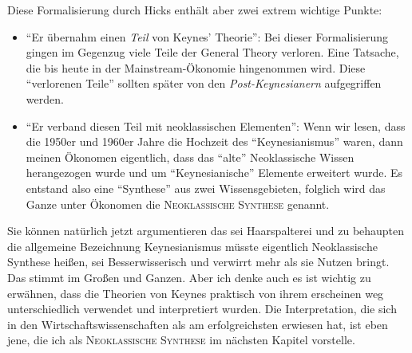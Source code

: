 Diese Formalisierung durch Hicks enthält aber zwei extrem wichtige Punkte:
\begin{itemize}
	\item "`Er übernahm einen \textit{Teil} von Keynes' Theorie"': Bei dieser Formalisierung gingen im Gegenzug viele Teile der General Theory verloren. Eine Tatsache, die bis heute in der Mainstream-Ökonomie hingenommen wird. Diese "`verlorenen Teile"' sollten später von den \textit{Post-Keynesianern} aufgegriffen werden.
	\item "`Er verband diesen Teil mit neoklassischen Elementen"': Wenn wir lesen, dass die 1950er und 1960er Jahre die Hochzeit des "`Keynesianismus"' waren, dann meinen Ökonomen eigentlich, dass das "`alte"' Neoklassische Wissen herangezogen wurde und um "`Keynesianische"' Elemente erweitert wurde. Es entstand also eine "`Synthese"' aus zwei Wissensgebieten, folglich wird das Ganze unter Ökonomen die \textsc{Neoklassische Synthese} genannt.
\end{itemize}

Sie können natürlich jetzt argumentieren das sei Haarspalterei und zu behaupten die allgemeine Bezeichnung Keynesianismus müsste eigentlich Neoklassische Synthese heißen, sei Besserwisserisch und verwirrt mehr als sie Nutzen bringt. Das stimmt im Großen und Ganzen. Aber ich denke auch es ist wichtig zu erwähnen, dass die Theorien von Keynes praktisch von ihrem erscheinen weg unterschiedlich verwendet und interpretiert wurden. Die Interpretation, die sich in den Wirtschaftswissenschaften als am erfolgreichsten erwiesen hat, ist eben jene, die ich als \textsc{Neoklassische Synthese} im nächsten Kapitel vorstelle. 



